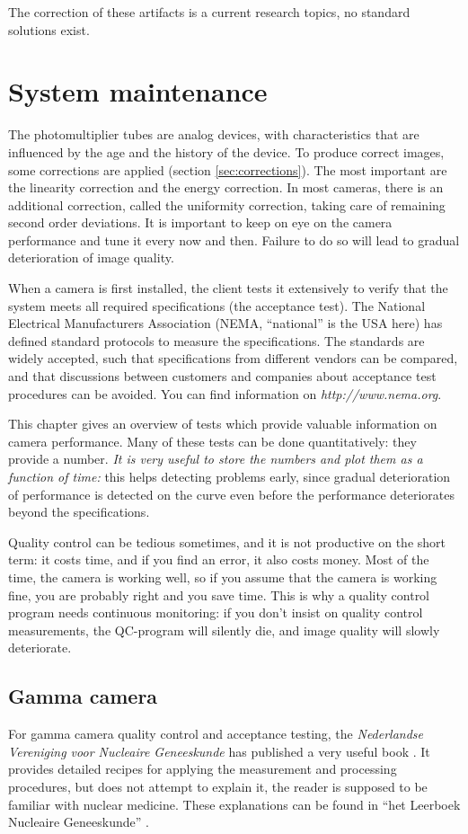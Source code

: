 \documentclass[11pt,oneside]{article}
\begin{document}
The correction of these artifacts is a current research topics, no standard
solutions exist.

\section{System maintenance}

The photomultiplier tubes are analog devices, with characteristics
that are influenced by the age and the history of the device. To
produce correct images, some corrections are applied (section
\ref{sec:corrections}). The most important are the linearity
correction and the energy correction. In most cameras, there is an
additional correction, called the uniformity correction, taking care
of remaining second order deviations. It is important to keep on eye
on the camera performance and tune it every now and then. Failure to
do so will lead to gradual deterioration of image quality.

When a camera is first installed, the client tests it extensively to
verify that the system meets all required specifications (the
acceptance test). The National Electrical Manufacturers Association
(NEMA, ``national'' is the USA here) has defined standard protocols to
measure the specifications. The standards are widely accepted, such
that specifications from different vendors can be compared, and that
discussions between customers and companies about acceptance test
procedures can be avoided. You can find information on {\em
http://www.nema.org}.

This chapter gives an overview of tests which provide valuable information on
camera performance. Many of these tests can be done quantitatively: they
provide a number. {\em It is very useful to store the numbers and plot them as
a function of time:} this helps detecting problems early, since gradual
deterioration of performance is detected on the curve even before the
performance deteriorates beyond the specifications.

Quality control can be tedious sometimes, and it is not productive on
the short term: it costs time, and if you find an error, it also costs
money. Most of the time, the camera is working well, so if you assume
that the camera is working fine, you are probably right and you save
time. This is why a quality control program needs continuous
monitoring: if you don't insist on quality control measurements, the
QC-program will silently die, and image quality will slowly
deteriorate.

\subsection{Gamma camera}
For gamma camera quality control and acceptance testing, the {\em Nederlandse
Vereniging voor Nucleaire Geneeskunde} has published a very useful book
\cite{Aanbevelingen}. It provides detailed recipes for applying the
measurement and processing procedures, but does not attempt to explain it, the
reader is supposed to be familiar with nuclear medicine. These explanations
can be found in ``het Leerboek Nucleaire Geneeskunde'' \cite{Leerboek}.
\end{document}
